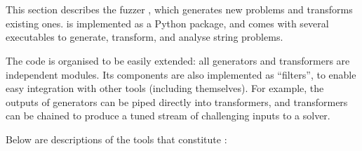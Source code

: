 \section{\fuzzer{}}

    This section describes the fuzzer \fuzzer{}, which generates new \smt{} problems and transforms existing ones. \fuzzer{} is implemented as a Python package, and comes with several executables to generate, transform, and analyse \smt{} string problems.


    The \fuzzer{} code is organised to be easily extended: all generators and transformers are independent modules. Its components are also implemented as \unix{} ``filters'', to enable easy integration with other tools (including themselves). For example, the outputs of generators can be piped directly into transformers, and transformers can be chained to produce a tuned stream of challenging inputs to a solver.

    Below are descriptions of the tools that constitute \fuzzer{}:

